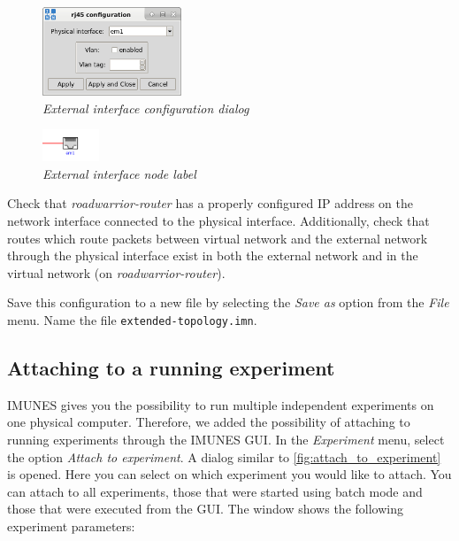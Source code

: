 \begin{figure}[H]
    \centering
    \includegraphics[width=0.37\textwidth]{./images/rj45_conf.png}
    \caption{\emph{External interface configuration dialog}}
    \label{fig:rj45_conf}
\end{figure}

\begin{figure}[H]
  \centering
  \vspace{10pt}
  \includegraphics[width=0.15\textwidth]{./images/rj45_canvas.png}
  \caption{\emph{External interface node label}}
  \label{fig:rj45_canvas}
\end{figure}

Check that \emph{roadwarrior-router} has a properly configured IP address on
the network interface connected to the physical interface. Additionally, check
that routes which route packets between virtual network and the external
network through the physical interface exist in both the external network and
in the virtual network (on \emph{roadwarrior-router}).

Save this configuration to a new file by selecting the \emph{Save as} option
from the \emph{File} menu. Name the file \texttt{extended-topology.imn}.

\subsection{Attaching to a running experiment}
IMUNES gives you the possibility to run multiple independent experiments on one
physical computer. Therefore, we added the possibility of attaching to running
experiments through the IMUNES GUI. In the \emph{Experiment} menu, select the
option \emph{Attach to experiment}. A dialog similar to
\ref{fig:attach_to_experiment} is opened. Here you can select on which
experiment you would like to attach. You can attach to all experiments, those
that were started using batch mode and those that were executed from the GUI.
The window shows the following experiment parameters:

